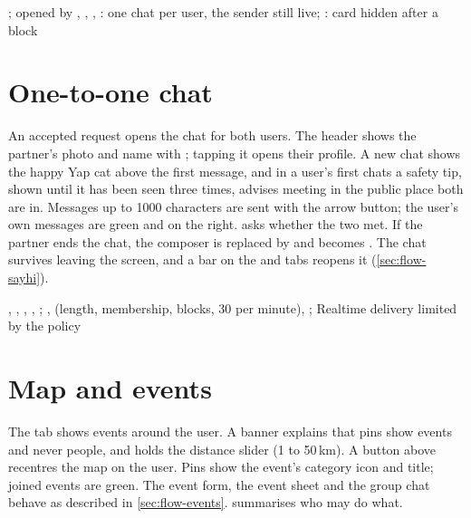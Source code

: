 \implemented
  {; opened by }
  {, , , }
  {: one chat per user, the sender still live; : card hidden after a block}

\section{One-to-one chat}

An accepted request opens the chat for both users. The header shows the partner's photo and name with
; tapping it opens their profile. A new chat shows the happy Yap cat
above the first message, and in a user's first chats a safety tip, shown until it has been seen three
times, advises meeting in the public place both are in. Messages up to 1000 characters are sent with the arrow button; the user's own messages
are green and on the right.  asks whether the two met. If the partner ends the chat, the
composer is replaced by  and  becomes . The chat survives leaving
the screen, and a bar on the  and  tabs reopens it (\cref{sec:flow-sayhi}).

\implemented
  {}
  {, , , , ; , }
  { (length, membership, blocks, 30 per minute), ; Realtime delivery limited by the  policy}

\section{Map and events}
\label{sec:feature-events}

The  tab shows events around the user. A banner explains that pins show events and never people,
and holds the distance slider (1 to 50\,km). A button above  recentres the map on
the user. Pins show the event's category icon and title; joined events are green. The event form, the
event sheet and the group chat behave as described in \cref{sec:flow-events}. 
summarises who may do what.

